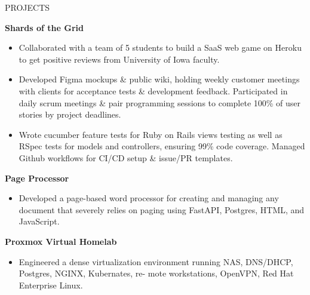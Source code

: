 \documentclass{resume} %
\begin{document}
\begin{rSection}{PROJECTS}
\vspace{-1.25em}
\item \textbf{Shards of the Grid} 
\begin{itemize}
   \itemsep -3pt {} 
     \item Collaborated with a team of 5 students to build a SaaS web game on Heroku to get positive reviews from University of Iowa faculty.
     \item Developed Figma mockups \& public wiki, holding weekly customer meetings with clients for acceptance tests \&
     development feedback. Participated in daily scrum meetings \& pair programming sessions to complete
     100\% of user stories by project deadlines.
     \item Wrote cucumber feature tests for Ruby on Rails views testing as well as RSpec tests for models and controllers,
     ensuring 99\% code coverage. Managed Github workflows for CI/CD setup \& issue/PR templates.
\end{itemize}



\item \textbf{Page Processor} 
\begin{itemize}
   \itemsep -3pt {} 
     \item Developed a page-based word processor for creating and managing any document that severely relies on paging
     using FastAPI, Postgres, HTML, and JavaScript.
\end{itemize}

\item \textbf{Proxmox Virtual Homelab} 


\begin{itemize}
   \itemsep -3pt {} 
     \item Engineered a dense virtualization environment running NAS, DNS/DHCP, Postgres, NGINX, Kubernates, re-
     mote workstations, OpenVPN, Red Hat Enterprise Linux.
\end{itemize}

\end{rSection} 
\end{document}
